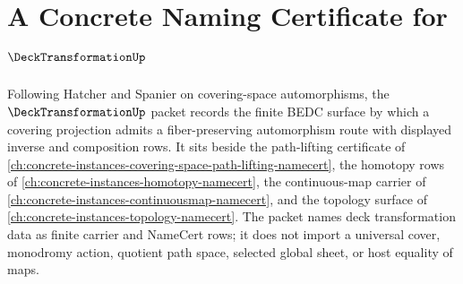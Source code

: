 \chapter{A Concrete Naming Certificate for $\DeckTransformationUp$}
\label{ch:concrete-instances-deck-transformation-namecert}

Following Hatcher and Spanier on covering-space automorphisms, the $\DeckTransformationUp$ packet records the finite BEDC surface by which a covering projection admits a fiber-preserving automorphism route with displayed inverse and composition rows. It sits beside the path-lifting certificate of \autoref{ch:concrete-instances-covering-space-path-lifting-namecert}, the homotopy rows of \autoref{ch:concrete-instances-homotopy-namecert}, the continuous-map carrier of \autoref{ch:concrete-instances-continuousmap-namecert}, and the topology surface of \autoref{ch:concrete-instances-topology-namecert}. The packet names deck transformation data as finite carrier and NameCert rows; it does not import a universal cover, monodromy action, quotient path space, selected global sheet, or host equality of maps.

